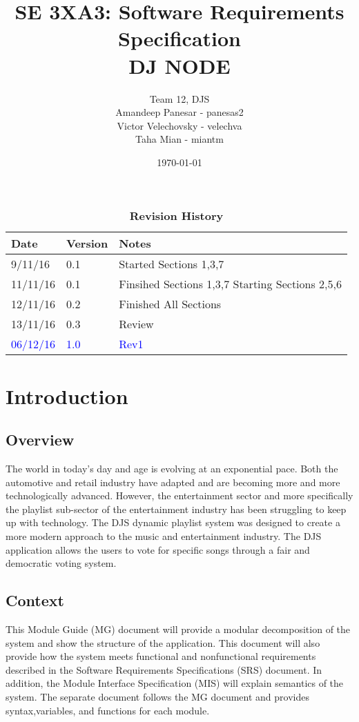 \documentclass[12pt, titlepage]{article}
\title{SE 3XA3: Software Requirements Specification\\DJ NODE}
\author{Team 12, DJS
		\\ Amandeep Panesar - panesas2
		\\ Victor Velechovsky - velechva
		\\ Taha Mian - miantm
}
\date{\today}
\begin{document}
\maketitle


\tableofcontents
\listoftables
\listoffigures


\begin{table}[h]
\caption{\bf Revision History}
\begin{tabularx}{\textwidth}{p{3cm}p{2cm}X}
\toprule {\bf Date} & {\bf Version} & {\bf Notes}\\
\midrule
9/11/16 & 0.1 & Started Sections 1,3,7\\
11/11/16 & 0.1 & Finsihed Sections 1,3,7 Starting Sections 2,5,6\\
12/11/16 & 0.2 & Finished All Sections\\
13/11/16 & 0.3 & Review \\
\textcolor{blue}{06/12/16} & \textcolor{blue}{1.0} &\textcolor{blue}{Rev1}\\
\bottomrule

\end{tabularx}
\end{table}


\clearpage




\section{Introduction}
\subsection{Overview}
The world in today's day and age is evolving at an exponential pace. Both the automotive and retail industry have adapted and are becoming more and more technologically advanced. However, the entertainment sector and more specifically the playlist sub-sector of the entertainment industry has been struggling to keep up with technology. The DJS dynamic playlist system was designed to create a more modern approach to the music and entertainment industry. The DJS application allows the users to vote for specific songs through a fair and democratic voting system.
\subsection{Context}
This Module Guide (MG) document will provide a modular decomposition of the system and show the structure of the application. This document will also provide how the system meets functional and nonfunctional requirements described in the Software Requirements Specifications (SRS) document. In addition, the Module Interface Specification (MIS) will explain semantics of the system. The separate document follows the MG document and provides syntax,variables, and functions for each module.
\end{document}
